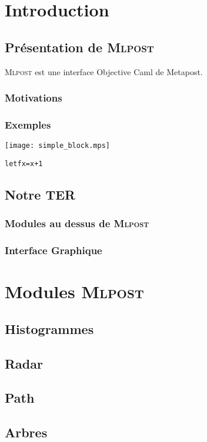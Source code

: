 \documentclass[a4paper,12pt]{article}
\newcommand{\mlpost}{\textsc{Mlpost }}
\begin{document}
\section{Introduction}

\subsection{Présentation de \mlpost}
\mlpost est une interface Objective Caml de Metapost.
\subsubsection{Motivations}

\subsubsection{Exemples}

\texttt{[image: simple\_block.mps]}

\begin{alltt}
  let f x = x + 1
\end{alltt}

\subsection{Notre TER}
\subsubsection{Modules au dessus de \mlpost}
\subsubsection{Interface Graphique}

\section{Modules \mlpost}

\subsection{Histogrammes}
\subsection{Radar}
\subsection{Path}
\subsection{Arbres}
\end{document}
